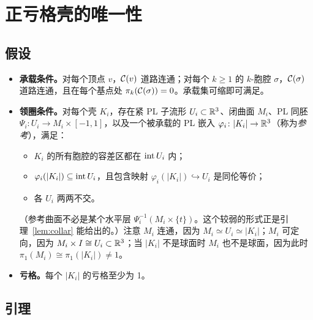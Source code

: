 \section{正亏格壳的唯一性}\label{sec:uniqueness}

\subsection{假设}
\begin{itemize}
\item \textbf{承载条件。}对每个顶点 $v$，$\mathcal{C}(v)$ 道路连通；对每个 $k\ge1$ 的 $k$-胞腔 $\sigma$，$\mathcal{C}(\sigma)$ 道路连通，且在每个基点处 $\pi_k(\mathcal{C}(\sigma))=0$。承载集可缩即可满足。
\item \textbf{领圈条件。}对每个壳 $K_i$，存在紧 PL 子流形 $U_i\subset\mathbb{R}^3$、闭曲面 $M_i$、PL 同胚 $\Psi_i\colon U_i\to M_i\times[-1,1]$，以及一个被承载的 PL 嵌入 $\varphi_i\colon|K_i|\to\mathbb{R}^3$（称为\emph{参考}），满足：
  \begin{itemize}
  \item $K_i$ 的所有胞腔的容差区都在 $\operatorname{int} U_i$ 内；
  \item $\varphi_i(|K_i|)\subseteq\operatorname{int} U_i$，且包含映射 $\varphi_i(|K_i|)\hookrightarrow U_i$ 是同伦等价；
  \item 各 $U_i$ 两两不交。
  \end{itemize}
  （参考曲面不必是某个水平层 $\Psi_i^{-1}(M_i\times\{t\})$。这个较弱的形式正是引理~\ref{lem:collar} 能给出的。）注意 $M_i$ 连通，因为 $M_i\simeq U_i\simeq|K_i|$；$M_i$ 可定向，因为 $M_i\times I\cong U_i\subset\mathbb{R}^3$；当 $|K_i|$ 不是球面时 $M_i$ 也不是球面，因为此时 $\pi_1(M_i)\cong\pi_1(|K_i|)\ne1$。
\item \textbf{亏格。}每个 $|K_i|$ 的亏格至少为 1。
\end{itemize}

\subsection{引理}

